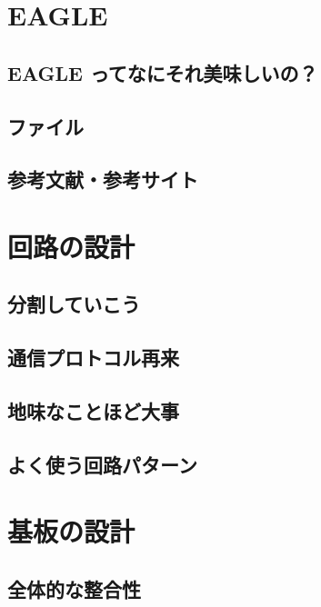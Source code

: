 \documentclass[dvipdfmx]{jsbook}
\begin{document}
\section{EAGLE}
\label{sub:EAGLE}

\subsection{EAGLE ってなにそれ美味しいの？}

\subsection{ファイル}

\subsection{参考文献・参考サイト}


\section{回路の設計}

\subsection{分割していこう}

\subsection{通信プロトコル再来}

\subsection{地味なことほど大事}

\subsection{よく使う回路パターン}


\section{基板の設計}

\subsection{全体的な整合性}
\end{document}
